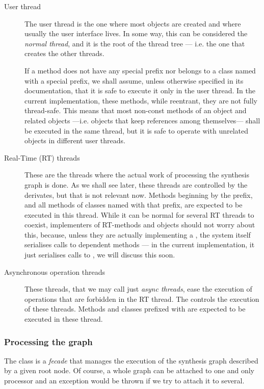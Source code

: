 \begin{description}
\item[User thread] The user thread is the one where most objects are
  created and where usually the user interface lives. In some way,
  this can be considered the \emph{normal thread}, and it is the root
  of the thread tree --- i.e. the one that creates the other threads.

  If a method does not have any special prefix nor belongs to a class
  named with a special prefix, we shall assume, unless otherwise
  specified in its documentation, that it is safe to execute it only
  in the user thread. In the current implementation, these methods,
  while reentrant, they are not fully thread-safe. This means that
  most non-const methods of an object and related objects
  ---i.e. objects that keep references among themselves--- shall be
  executed in the same thread, but it is safe to operate with
  unrelated objects in different user threads.

\item[Real-Time (RT) threads] These are the threads where the actual
  work of processing the synthesis graph is done. As we shall see
  later, these threads are controlled by the 
  derivates, but that is not relevant now. Methods beginning by the
   prefix, and all methods of classes named with that
  prefix, are expected to be executed in this thread. While it can be
  normal for several RT threads to coexist, implementers of RT-methods
  and objects should not worry about this, because, unless they are
  actually implementing a , the system itself
  serialises calls to dependent methods --- in the current
  implementation, it just serialises calls to
  , we will discuss this soon.

\item[Asynchronous operation threads] These threads, that we
  may call just \emph{async threads}, ease the execution of operations
  that are forbidden in the RT thread. The  controls
  the execution of these threads. Methods and classes prefixed with
   are expected to be executed in these thread.
\end{description}

\subsubsection{Processing the graph}

The  class is a \emph{fecade} that manages the
execution of the synthesis graph described by a given root node. Of
course, a whole graph can be attached to one and only processor and an
exception would be thrown if we try to attach it to several.

